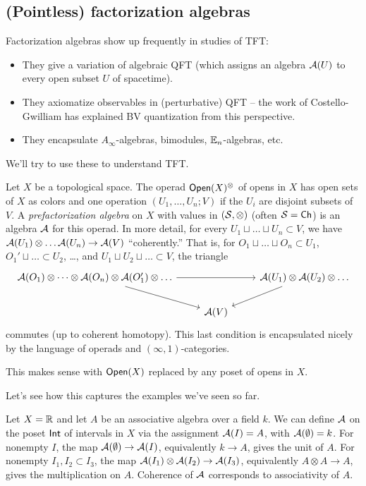 \subsection{(Pointless) factorization algebras}

Factorization algebras show up frequently in studies of TFT:
\begin{itemize}
	\item They give a variation of algebraic QFT (which assigns an algebra $\mathcal{A}(U)$ to every open subset $U$ of spacetime).
	\item They axiomatize observables in (perturbative) QFT -- the work of Costello-Gwilliam has explained BV quantization from this perspective.
	\item They encapsulate $A_\infty$-algebras, bimodules, $\mathbb{E}_n$-algebras, etc.
\end{itemize}
We'll try to use these to understand TFT.

\begin{dfn}
	Let $X$ be a topological space.
	The operad $\mathsf{Open}(X)^{\otimes}$ of opens in $X$ has open sets of $X$ as colors and one operation $(U_1, \dots, U_n; V)$ if the $U_i$ are disjoint subsets of $V$.
	A \emph{prefactorization algebra} on $X$ with values in $(\mathcal{S}, \otimes)$ (often $\mathcal{S} = \mathsf{Ch}$) is an algebra $\mathcal{A}$ for this operad.
	In more detail, for every $U_1 \sqcup \dots \sqcup U_n \subset V$, we have $\mathcal{A}(U_1) \otimes \dots \mathcal{A}(U_n) \to \mathcal{A}(V)$ ``coherently.''
	That is, for $O_1 \sqcup \dots \sqcup O_n \subset U_1$, $O_1' \sqcup \dots \subset U_2$, \dots, and $U_1 \sqcup U_2 \sqcup \dots \subset V$, the triangle
	\[
		\begin{tikzcd}
			\Ac(O_1) \otimes \dots \otimes \Ac(O_n) \otimes \Ac(O_1') \otimes \dots \ar[rr] \ar[dr] & & \Ac(U_1) \otimes \Ac(U_2) \otimes \dots \ar[dl] \\
														& \Ac(V) &
		\end{tikzcd}
	\]
	commutes (up to coherent homotopy).
	This last condition is encapsulated nicely by the language of operads and $(\infty, 1)$-categories.
\end{dfn}

\begin{rmk}
	This makes sense with $\mathsf{Open}(X)$ replaced by any poset of opens in $X$.
\end{rmk}

Let's see how this captures the examples we've seen so far.

\begin{ex}
	Let $X = \mathbb{R}$ and let $A$ be an associative algebra over a field $k$.
	We can define $\mathcal{A}$ on the poset $\mathsf{Int}$ of intervals in $X$ via the assignment $\mathcal{A}(I) = A$, with $\mathcal{A}(\emptyset) = k$.
	For nonempty $I$, the map $\mathcal{A}(\emptyset) \to \mathcal{A}(I)$, equivalently $k \to A$, gives the unit of $A$.
	For nonempty $I_1, I_2 \subset I_3$, the map $\mathcal{A}(I_1) \otimes \mathcal{A}(I_2) \to \mathcal{A}(I_3)$, equivalently $A \otimes A \to A$, gives the multiplication on $A$.
	Coherence of $\mathcal{A}$ corresponds to associativity of $A$.
\end{ex}

